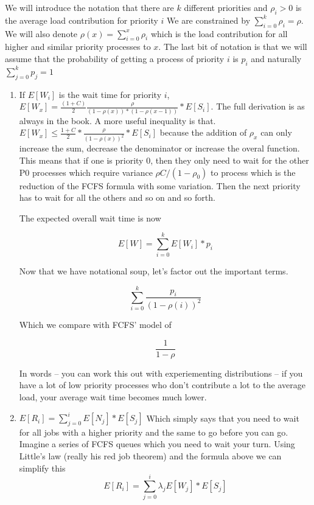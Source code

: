 We will introduce the notation that there are $k$ different priorities and $\rho_i > 0$ is the average load contribution for priority $i$ We are constrained by $\sum\limits_{i=0}^k \rho_i = \rho$.
We will also denote $\rho(x) = \sum\limits_{i=0}^x \rho_i$ which is the load contribution for all higher and similar priority processes to $x$.
The last bit of notation is that we will assume that the probability of getting a process of priority $i$ is $p_i$ and naturally $\sum\limits_{j=0}^k p_j = 1$
 
\begin{enumerate}
 \item If $E[W_i]$ is the wait time for priority $i$, $E[W_x] = \frac{(1 + C)}{2}\frac{\rho}{(1 - \rho(x))*( 1 - \rho(x-1))} * E[S_i]$.
    The full derivation is as always in the book.
    A more useful inequality is that.
  $E[W_x] \leq \frac{1 + C}{2}* \frac{\rho}{(1 - \rho(x))^2} * E[S_i]$ because the addition of $\rho_x$ can only increase the sum, decrease the denominator or increase the overal function.
  This means that if one is priority 0, then they only need to wait for the other P0 processes which require variance $\rho C/ (1 - \rho_0)$ to process which is the reduction of the FCFS formula with some variation.
  Then the next priority has to wait for all the others and so on and so forth.

  The expected overall wait time is now

  \[
      E[W] = \sum\limits_{i=0}^k E[W_i] * p_i
  \]

  Now that we have notational soup, let's factor out the important terms.

  \[
      \sum\limits_{i=0}^k \frac{p_i}{(1-\rho(i))^2}
  \]

  Which we compare with FCFS' model of

  \[
      \frac{1}{1-\rho}
      \]

  In words -- you can work this out with experiementing distributions -- if you have a lot of low priority processes who don't contribute a lot to the average load, your average wait time becomes much lower.

\item $E[R_i] = \sum\limits_{j = 0}^i E[N_j] * E[S_j]$ Which simply says that you need to wait for all jobs with a higher priority and the same to go before you can go.
  Imagine a series of FCFS queues which you need to wait your turn.
  Using Little's law (really his red job theorem) and the formula above we can simplify this
  \[
      E[R_i] = \sum\limits_{j=0}^i \lambda_j E[W_j] * E[S_j]
  \]


\end{enumerate}
